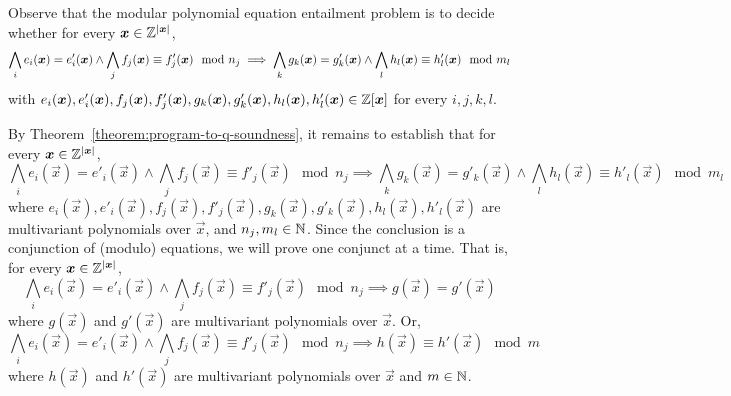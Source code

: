 
Observe that the modular polynomial equation entailment problem is to
decide whether for every $\vx \in \bbfZ^{|\vx|}$,
\[
  \bigwedge\limits_i e_i (\vx) = e'_i (\vx) \wedge
  \bigwedge\limits_j f_j (\vx) \equiv f'_j (\vx) \mod n_j
  \implies
  \bigwedge\limits_k g_k (\vx) = g'_k (\vx) \wedge
  \bigwedge\limits_l   h_l (\vx) \equiv h'_l (\vx) \mod m_l
\]
with 
$e_i (\vx), e'_i (\vx), f_j (\vx), f'_j (\vx),
 g_k (\vx), g'_k (\vx), h_l (\vx), h'_l (\vx) \in \bbfZ[\vx]$
for every $i, j, k, l$.

By
Theorem~\ref{theorem:program-to-q-soundness}, it remains to establish
that for every $\vec{x} \in \bbfZ^{|\vec{x}|}$, 
\[
  \bigwedge\limits_i e_i (\vec{x}) = e'_i (\vec{x}) \wedge
  \bigwedge\limits_j f_j (\vec{x}) \equiv f'_j (\vec{x}) \mod n_j
  \implies
  \bigwedge\limits_k g_k (\vec{x}) = g'_k (\vec{x}) \wedge
  \bigwedge\limits_l   h_l (\vec{x}) \equiv h'_l (\vec{x}) \mod m_l
\]
where
$e_i (\vec{x}), e'_i (\vec{x}), f_j (\vec{x}), f'_j (\vec{x}),
 g_k (\vec{x}), g'_k (\vec{x}), h_l (\vec{x}), h'_l (\vec{x})$
are multivariant polynomials over $\vec{x}$, and
$n_j, m_l \in \mathbb{N} $. Since the conclusion is a conjunction of
(modulo) equations, we will prove one conjunct at a time. That is, for
every $\vec{x} \in \bbfZ^{|\vec{x}|}$, 
\[
  \bigwedge\limits_i e_i (\vec{x}) = e'_i (\vec{x}) \wedge
  \bigwedge\limits_j f_j (\vec{x}) \equiv f'_j (\vec{x}) \mod n_j
  \implies
  g (\vec{x}) = g' (\vec{x})
\] where $g (\vec{x})$ and $g' (\vec{x})$ are multivariant polynomials
over $\vec{x}$. Or,
\[
  \bigwedge\limits_i e_i (\vec{x}) = e'_i (\vec{x}) \wedge
  \bigwedge\limits_j f_j (\vec{x}) \equiv f'_j (\vec{x}) \mod n_j
  \implies
  h (\vec{x}) \equiv h' (\vec{x}) \mod m
\] where $h (\vec{x})$ and $h' (\vec{x})$ are multivariant polynomials
over $\vec{x}$ and $m \in \mathbb{N}$.


